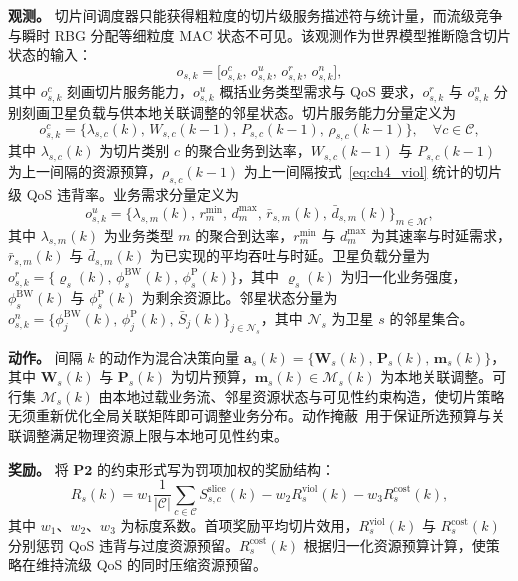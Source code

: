 \textbf{观测。} 切片间调度器只能获得粗粒度的切片级服务描述符与统计量，而流级竞争与瞬时 RBG 分配等细粒度 MAC 状态不可见。该观测作为世界模型推断隐含切片状态的输入：
\begin{equation}\label{eq:ch4_obs}
o_{s,k}=\big[o_{s,k}^{c},\,o_{s,k}^{u},\,o_{s,k}^{r},\,o_{s,k}^{n}\big],
\end{equation}
其中 $o_{s,k}^{c}$ 刻画切片服务能力，$o_{s,k}^{u}$ 概括业务类型需求与 QoS 要求，$o_{s,k}^{r}$ 与 $o_{s,k}^{n}$ 分别刻画卫星负载与供本地关联调整的邻星状态。切片服务能力分量定义为
\begin{equation}\label{eq:ch4_obs_c}
o_{s,k}^{c}=\big\{\lambda_{s,c}(k),\,W_{s,c}(k-1),\,P_{s,c}(k-1),\,\rho_{s,c}(k-1)\big\},\quad\forall c\in\mathcal C,
\end{equation}
其中 $\lambda_{s,c}(k)$ 为切片类别 $c$ 的聚合业务到达率，$W_{s,c}(k-1)$ 与 $P_{s,c}(k-1)$ 为上一间隔的资源预算，$\rho_{s,c}(k-1)$ 为上一间隔按式~\eqref{eq:ch4_viol} 统计的切片级 QoS 违背率。业务需求分量定义为
\begin{equation}\label{eq:ch4_obs_u}
o_{s,k}^{u}=\big\{\lambda_{s,m}(k),\,r_m^{\min},\,d_m^{\max},\,\bar r_{s,m}(k),\,\bar d_{s,m}(k)\big\}_{m\in\mathcal M},
\end{equation}
其中 $\lambda_{s,m}(k)$ 为业务类型 $m$ 的聚合到达率，$r_m^{\min}$ 与 $d_m^{\max}$ 为其速率与时延需求，$\bar r_{s,m}(k)$ 与 $\bar d_{s,m}(k)$ 为已实现的平均吞吐与时延。卫星负载分量为 $o_{s,k}^{r}=\{\varrho_s(k),\,\phi_s^{\mathrm{BW}}(k),\,\phi_s^{\mathrm{P}}(k)\}$，其中 $\varrho_s(k)$ 为归一化业务强度，$\phi_s^{\mathrm{BW}}(k)$ 与 $\phi_s^{\mathrm{P}}(k)$ 为剩余资源比。邻星状态分量为 $o_{s,k}^{n}=\{\phi_j^{\mathrm{BW}}(k),\,\phi_j^{\mathrm{P}}(k),\,\bar S_j(k)\}_{j\in\mathcal N_s}$，其中 $\mathcal N_s$ 为卫星 $s$ 的邻星集合。

\textbf{动作。} 间隔 $k$ 的动作为混合决策向量 $\mathbf a_s(k)=\{\mathbf W_s(k),\,\mathbf P_s(k),\,\mathbf m_s(k)\}$，其中 $\mathbf W_s(k)$ 与 $\mathbf P_s(k)$ 为切片预算，$\mathbf m_s(k)\in\mathcal M_s(k)$ 为本地关联调整。可行集 $\mathcal M_s(k)$ 由本地过载业务流、邻星资源状态与可见性约束构造，使切片策略无须重新优化全局关联矩阵即可调整业务分布。动作掩蔽~\cite{Huang-InvalidActionMasking-FLAIRS22}用于保证所选预算与关联调整满足物理资源上限与本地可见性约束。

\textbf{奖励。} 将 $\mathbf{P2}$ 的约束形式写为罚项加权的奖励结构：
\begin{equation}\label{eq:ch4_reward}
R_s(k)=w_1\frac{1}{|\mathcal C|}\sum_{c\in\mathcal C}S_{s,c}^{\mathrm{slice}}(k)-w_2R_s^{\mathrm{viol}}(k)-w_3R_s^{\mathrm{cost}}(k),
\end{equation}
其中 $w_1$、$w_2$、$w_3$ 为标度系数。首项奖励平均切片效用，$R_s^{\mathrm{viol}}(k)$ 与 $R_s^{\mathrm{cost}}(k)$ 分别惩罚 QoS 违背与过度资源预留。$R_s^{\mathrm{cost}}(k)$ 根据归一化资源预算计算，使策略在维持流级 QoS 的同时压缩资源预留。

